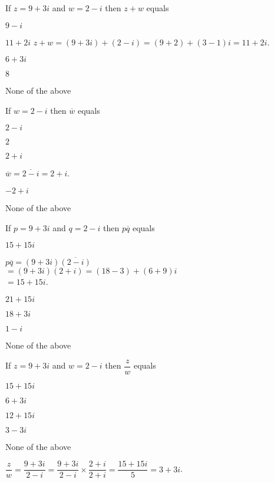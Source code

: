 \documentclass[pst2pdf]{webquiz}
\begin{document}
\begin{question}
If $z=9+3i$ and $w=2-i$ then $z+w$ equals
\begin{choice}
\incorrect $9-i$

\correct $11+2i$
\response $z+w=(9+3i)+(2-i)=(9+2)+(3-1)i=11+2i$.

\incorrect $6+3i$

\incorrect $8$

\incorrect None of the above

\end{choice}
\end{question}


\begin{question}
If $w=2-i$ then $\overline{w}$ equals
\begin{choice}
\incorrect $2-i$

\incorrect $2$

\correct $2+i$

\response
$\overline{w}=\overline{2-i}=2+i$.

\incorrect $-2+i$

\incorrect None of the above
\end{choice}
\end{question}

\begin{question}
If $p=9+3i$ and $q=2-i$ then $p\overline{q}$ equals
\begin{choice}

\correct $15+15i$

\response
$p\overline{q}=(9+3i)\overline{(2-i)}$ \\
$=(9+3i)(2+i)= (18-3)+(6+9)i$\\
$=15+15i$.

\incorrect $21+15i$

\incorrect $18+3i$

\incorrect $1-i$

\incorrect None of the above

\end{choice}
\end{question}


\begin{question}
If $z=9+3i$ and $w=2-i$ then $\dfrac{z}{w}$ equals
\begin{choice}
\incorrect $15+15i$

\incorrect $6+3i$

\incorrect $12+15i$

\incorrect $3-3i$

\correct None of the above

\response
\(\dfrac{z}{w}=\dfrac{9+3i}{2-i}
            =\dfrac{9+3i}{2-i}\times \dfrac{2+i}{2+i}
            =\dfrac{15+15i}{5}=3+3i\).
\end{choice}
\end{question}
\end{document}
